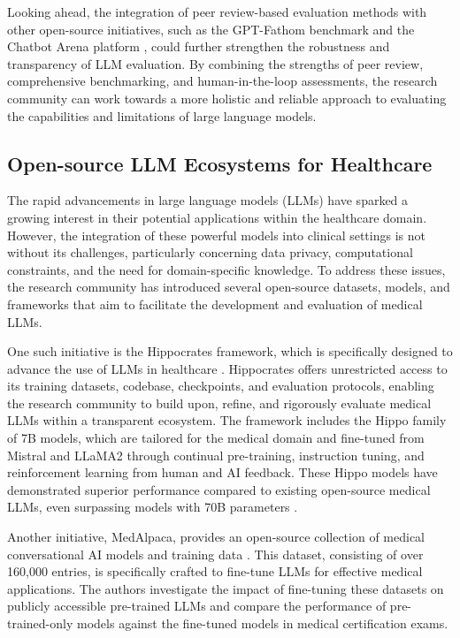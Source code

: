 \documentclass[11pt]{article}
\begin{document}
Looking ahead, the integration of peer review-based evaluation methods with other open-source initiatives, such as the GPT-Fathom benchmark \cite{ref83} and the Chatbot Arena platform \cite{ref308}, could further strengthen the robustness and transparency of LLM evaluation. By combining the strengths of peer review, comprehensive benchmarking, and human-in-the-loop assessments, the research community can work towards a more holistic and reliable approach to evaluating the capabilities and limitations of large language models.

\subsection{Open-source LLM Ecosystems for Healthcare}

The rapid advancements in large language models (LLMs) have sparked a growing interest in their potential applications within the healthcare domain. However, the integration of these powerful models into clinical settings is not without its challenges, particularly concerning data privacy, computational constraints, and the need for domain-specific knowledge. To address these issues, the research community has introduced several open-source datasets, models, and frameworks that aim to facilitate the development and evaluation of medical LLMs.

One such initiative is the Hippocrates framework, which is specifically designed to advance the use of LLMs in healthcare \cite{ref86}. Hippocrates offers unrestricted access to its training datasets, codebase, checkpoints, and evaluation protocols, enabling the research community to build upon, refine, and rigorously evaluate medical LLMs within a transparent ecosystem. The framework includes the Hippo family of 7B models, which are tailored for the medical domain and fine-tuned from Mistral and LLaMA2 through continual pre-training, instruction tuning, and reinforcement learning from human and AI feedback. These Hippo models have demonstrated superior performance compared to existing open-source medical LLMs, even surpassing models with 70B parameters \cite{ref86}.

Another initiative, MedAlpaca, provides an open-source collection of medical conversational AI models and training data \cite{ref85}. This dataset, consisting of over 160,000 entries, is specifically crafted to fine-tune LLMs for effective medical applications. The authors investigate the impact of fine-tuning these datasets on publicly accessible pre-trained LLMs and compare the performance of pre-trained-only models against the fine-tuned models in medical certification exams.
\end{document}
